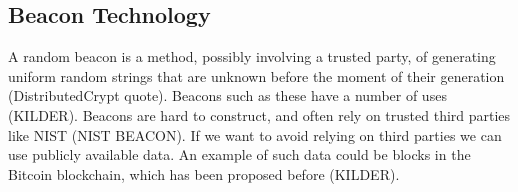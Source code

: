 \subsection{Beacon Technology}
A random beacon is a method, possibly involving a trusted party, of generating uniform random strings that are unknown before the moment of their generation (DistributedCrypt quote). Beacons such as these have a number of uses (KILDER). Beacons are hard to construct, and often rely on trusted third parties like NIST (NIST BEACON). If we want to avoid relying on third parties we can use publicly available data. An example of such data could be blocks in the Bitcoin blockchain, which has been proposed before (KILDER). 
